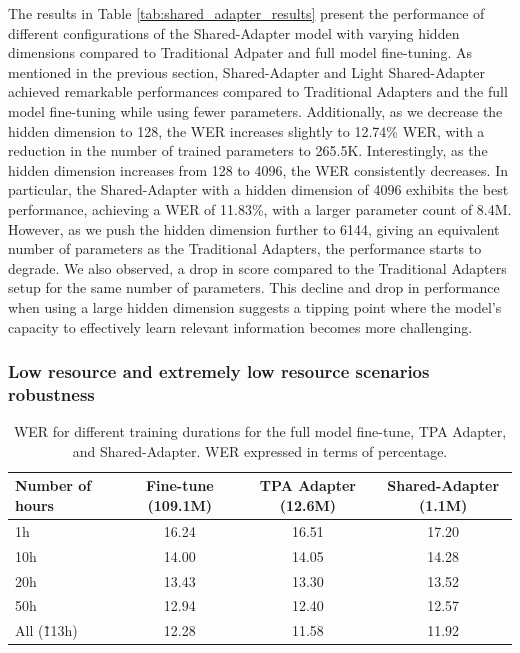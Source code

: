 The results in Table \ref{tab:shared_adapter_results} present the performance of different configurations of the Shared-Adapter model with varying hidden dimensions compared to Traditional Adpater and full model fine-tuning. As mentioned in the previous section, Shared-Adapter and Light Shared-Adapter achieved remarkable performances compared to Traditional Adapters and the full model fine-tuning while using fewer parameters. Additionally, as we decrease the hidden dimension to 128, the WER increases slightly to 12.74\% \ac{WER}, with a reduction in the number of trained parameters to 265.5K. Interestingly, as the hidden dimension increases from 128 to 4096, the \ac{WER} consistently decreases. In particular, the Shared-Adapter with a hidden dimension of 4096 exhibits the best performance, achieving a \ac{WER} of 11.83\%, with a larger parameter count of 8.4M. 
However, as we push the hidden dimension further to 6144, giving an equivalent number of parameters as the Traditional Adapters, the performance starts to degrade. We also observed, a drop in score compared to the Traditional Adapters setup for the same number of parameters. This decline and drop in performance when using a large hidden dimension suggests a tipping point where the model's capacity to effectively learn relevant information becomes more challenging.


\subsubsection{Low resource and extremely low resource scenarios robustness}
\label{sec:hours_PETL}
\begin{table}[h]
    \centering
    \begin{tabular}{l c c c}
        \hline
        Number of hours & Fine-tune (109.1M) & TPA Adapter (12.6M) & Shared-Adapter (1.1M) \\
        \hline
        1h & 16.24 & 16.51 & 17.20 \\
        10h & 14.00 & 14.05 & 14.28 \\
        20h & 13.43 & 13.30 & 13.52 \\
        50h & 12.94 & 12.40 & 12.57 \\
        All (\~113h) & 12.28 & 11.58 & 11.92 \\
        \hline
    \end{tabular}
    \caption{WER for different training durations for the full model fine-tune, TPA Adapter, and Shared-Adapter. WER expressed in terms of percentage.}
    \label{tab:training_duration_results}
\end{table}

